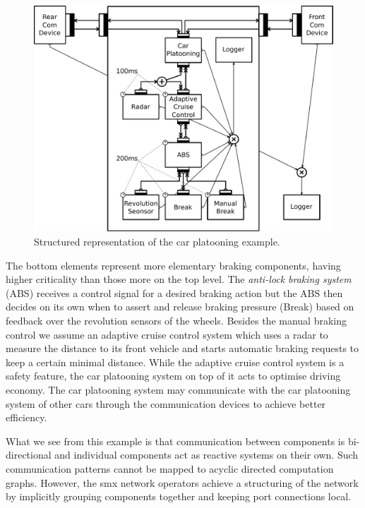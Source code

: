 \begin{figure}[bht]\begin{center}
    \TopFigSpace
    \includegraphics[width=\textwidth]{fig/cpa_nw.pdf}
    \CaptionFigSpace
    \caption{Structured representation of the car platooning example.}
    \label{fig_smx_cpa}
    \BotFigSpace
\end{center}\end{figure}

The bottom elements represent more elementary braking components, having higher criticality than those more on the top level.
The {\em anti-lock braking system} (ABS) receives a control signal for a desired braking action but the ABS then decides on its own when to assert and release braking pressure (Break) based on feedback over the revolution sensors of the wheels.
Besides the manual braking control we assume an adaptive cruise control system which uses a radar to measure the distance to its front vehicle and starts automatic braking requests to keep a certain minimal distance.
While the adaptive cruise control system is a safety feature, the car platooning system on top of it acts to optimise driving economy.
The car platooning system may communicate with the car platooning system of other cars through the communication devices to achieve better efficiency.

What we see from this example is that communication between components is bi-directional and individual components act as reactive systems on their own.
Such communication patterns cannot be mapped to acyclic directed computation graphs.
However, the \gls*{smx} network operators achieve a structuring of the network by implicitly grouping components together and keeping port connections local.

